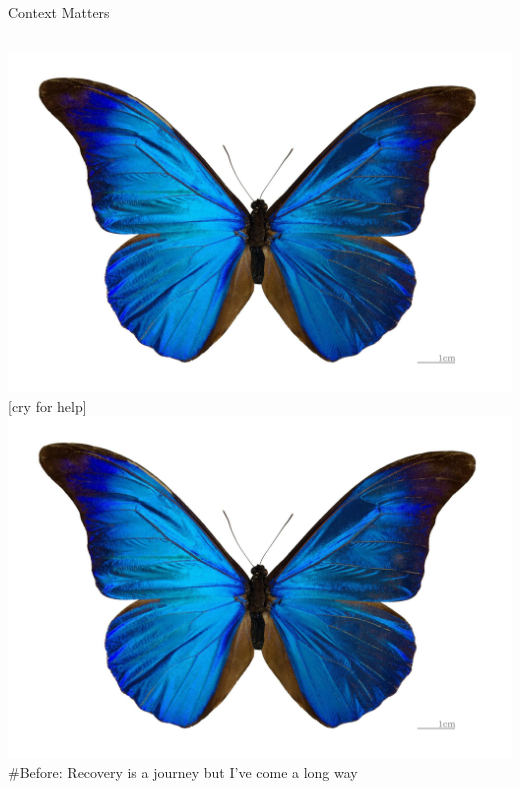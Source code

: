 \documentclass[nobackground,dvipsnames,table]{beamer}
\begin{document}
\begin{frame}{Context Matters}
    \begin{columns}[T]
            \includegraphics[width=\textwidth]{butterfly}
            [cry for help]
            \includegraphics[width=\textwidth]{butterfly}
            \#Before: Recovery is a journey but I've come a long way
    \end{columns}    
\end{frame}
\end{document}
